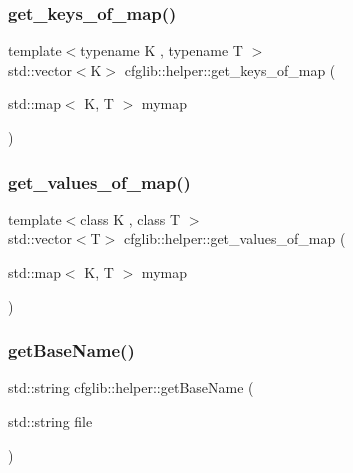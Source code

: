 \subsubsection{\texorpdfstring{get\+\_\+keys\+\_\+of\+\_\+map()}{get\_keys\_of\_map()}}
{\footnotesize\ttfamily template$<$typename K , typename T $>$ \\
std\+::vector$<$K$>$ cfglib\+::helper\+::get\+\_\+keys\+\_\+of\+\_\+map (\begin{DoxyParamCaption}\item[{std\+::map$<$ K, T $>$}]{mymap }\end{DoxyParamCaption})\hspace{0.3cm}{\ttfamily [inline]}}

\mbox{\label{namespacecfglib_1_1helper_a5987d38b64c30a3c137e126f8fb9c40e}} 
\subsubsection{\texorpdfstring{get\+\_\+values\+\_\+of\+\_\+map()}{get\_values\_of\_map()}}
{\footnotesize\ttfamily template$<$class K , class T $>$ \\
std\+::vector$<$T$>$ cfglib\+::helper\+::get\+\_\+values\+\_\+of\+\_\+map (\begin{DoxyParamCaption}\item[{std\+::map$<$ K, T $>$}]{mymap }\end{DoxyParamCaption})\hspace{0.3cm}{\ttfamily [inline]}}

\mbox{\label{namespacecfglib_1_1helper_a7cf8c4c7057fb03857f0f9844ffcca62}} 
\subsubsection{\texorpdfstring{get\+Base\+Name()}{getBaseName()}}
{\footnotesize\ttfamily std\+::string cfglib\+::helper\+::get\+Base\+Name (\begin{DoxyParamCaption}\item[{std\+::string}]{file }\end{DoxyParamCaption})\hspace{0.3cm}{\ttfamily [inline]}}

